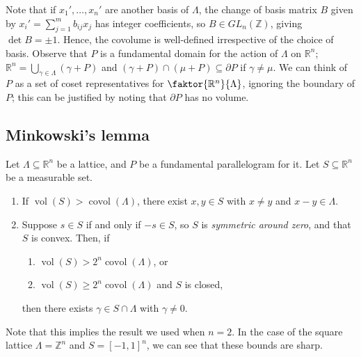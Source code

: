 Note that if \( x_1', \dots, x_n' \) are another basis of \( \Lambda \), the change of basis matrix \( B \) given by \( x_i' = \sum_{j=1}^m b_{ij} x_j \) has integer coefficients, so \( B \in GL_n(\mathbb Z) \), giving \( \det B = \pm 1 \).
Hence, the covolume is well-defined irrespective of the choice of basis.
Observe that \( P \) is a fundamental domain for the action of \( \Lambda \) on \( \mathbb R^n \); \( \mathbb R^n = \bigcup_{\gamma \in \Lambda} (\gamma + P) \) and \( (\gamma + P) \cap (\mu + P) \subseteq \partial P \) if \( \gamma \neq \mu \).
We can think of \( P \) as a set of coset representatives for \( \faktor{\mathbb R^n}{\Lambda} \), ignoring the boundary of \( P \); this can be justified by noting that \( \partial P \) has no volume.

\subsection{Minkowski's lemma}
\begin{theorem}
    Let \( \Lambda \subseteq \mathbb R^n \) be a lattice, and \( P \) be a fundamental parallelogram for it.
    Let \( S \subseteq \mathbb R^n \) be a measurable set.
    \begin{enumerate}
        \item If \( \operatorname{vol}(S) > \operatorname{covol}(\Lambda) \), there exist \( x, y \in S \) with \( x \neq y \) and \( x - y \in \Lambda \).
        \item Suppose \( s \in S \) if and only if \( -s \in S \), so \( S \) is \emph{symmetric around zero}, and that \( S \) is convex.
        Then, if
        \begin{enumerate}
            \item \( \operatorname{vol}(S) > 2^n \operatorname{covol}(\Lambda) \), or
            \item \( \operatorname{vol}(S) \geq 2^n \operatorname{covol}(\Lambda) \) and \( S \) is closed,
        \end{enumerate}
        then there exists \( \gamma \in S \cap \Lambda \) with \( \gamma \neq 0 \).
    \end{enumerate}
\end{theorem}
Note that this implies the result we used when \( n = 2 \).
In the case of the square lattice \( \Lambda = \mathbb Z^n \) and \( S = [-1,1]^n \), we can see that these bounds are sharp.
